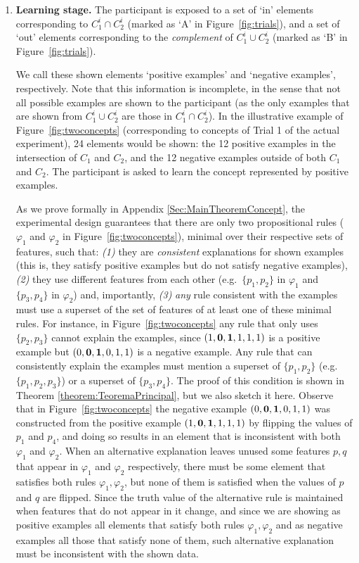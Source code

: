 \begin{enumerate}
    \item \label{item:LearningStage}{\bf Learning stage.} The participant is exposed to a set of `in' elements corresponding to $C^i_1\cap C^i_2$ (marked as `{\sf A}' in Figure~\ref{fig:trials}), and a set of `out' elements corresponding to the {\em complement} of $C^i_1\cup C^i_2$ (marked as `{\sf B}' in Figure~\ref{fig:trials}). 
    
    We call these shown elements `positive examples' and `negative examples', respectively. Note that this information is incomplete, in the sense that not all possible examples are shown to the participant (as the only examples that are shown from $C^i_1\cup C^i_2$ are those in $C^i_1\cap C^i_2$). In the illustrative example of Figure~\ref{fig:twoconcepts} (corresponding to concepts of Trial 1 of the actual experiment), 24 elements would be shown: the 12 positive examples in the intersection of $C_1$ and $C_2$, and the 12 negative examples outside of both $C_1$ and $C_2$. The participant is asked to learn the concept represented by positive examples.

  As we prove formally in Appendix \ref{Sec:MainTheoremConcept}, the experimental design guarantees that there are only two propositional rules ($\varphi_1$ and $\varphi_2$ in Figure~\ref{fig:twoconcepts}), minimal over their respective sets of features, such that: \textit{(1)} they are \textit{consistent} explanations for shown examples (this is, they satisfy positive examples but do not satisfy negative examples), \textit{(2)} they use different features from each other (e.g.\ $\{p_1, p_2\}$ in $\varphi_1$ and $\{p_3,p_4\}$ in $\varphi_2$)  and, importantly, \textit{(3)} \textit{any} rule consistent with the examples must use a superset of the set of features of at least one of these minimal rules. For instance, in Figure~\ref{fig:twoconcepts} any rule that only uses $\{p_2, p_3\}$ cannot explain the examples, since $(1,{\bf 0},{\bf 1},1,1,1)$ is a positive example but  $(0,{\bf 0},{\bf 1},0,1,1)$  is a negative example. Any rule that can consistently explain the examples must mention a superset of $\{p_1, p_2\}$ (e.g.\  $\{p_1, p_2, p_3\}$) or a superset of $\{p_3, p_4\}$. The proof of this condition is shown in Theorem \ref{theorem:TeoremaPrincipal}, but we also sketch it  here. Observe that in Figure~\ref{fig:twoconcepts} the negative example  $(0,{\bf 0},{\bf 1},0,1,1)$  was constructed from the positive example  $(1,{\bf 0},{\bf 1},1,1,1)$ by flipping the values of $p_1$ and $p_4$, and doing so results in an element that is inconsistent with both $\varphi_1$ and $\varphi_2$. When an alternative explanation leaves unused some features $p,q$ that appear in $\varphi_1$ and $\varphi_2$ respectively, there must be some element that satisfies both rules $\varphi_1,\varphi_2$, but none of them is satisfied when the values of $p$ and $q$ are flipped. Since the truth value of the alternative rule is maintained when features that do not appear in it change, and since we are showing as positive examples all elements that satisfy both rules $\varphi_1,\varphi_2$ and as negative examples all those that satisfy none of them, such alternative explanation must be inconsistent with the shown data.


\end{enumerate}
